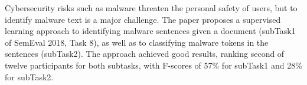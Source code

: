 Cybersecurity risks such as malware threaten the personal safety of users, but to identify malware text is a major challenge. The paper proposes a supervised learning approach to identifying malware sentences given a document (subTask1 of SemEval 2018, Task 8), as well as to classifying malware tokens in the sentences (subTask2). The approach achieved good results, ranking second of twelve participants for both subtasks, with F-scores of 57\% for subTask1 and 28\% for subTask2.
